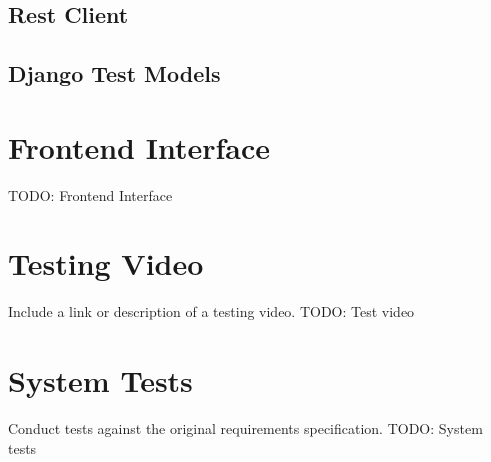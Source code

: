 \subsection{Rest Client}

\subsection{Django Test Models}

\section{Frontend Interface}    
TODO: Frontend Interface

\section{Testing Video}
Include a link or description of a testing video.
TODO: Test video

\section{System Tests}
Conduct tests against the original requirements specification.
TODO: System tests



